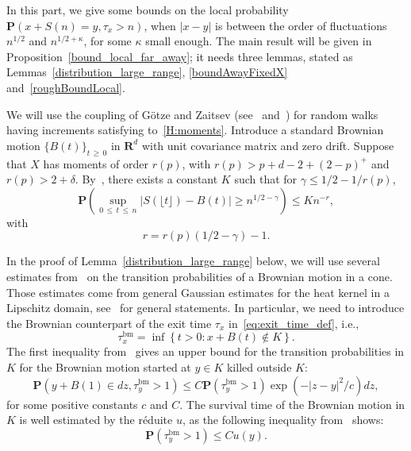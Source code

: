 \documentclass[10pt]{amsart}
\theoremstyle{definition}\newtheorem{defi}[theo]{Definition}\newtheorem{rema}[theo]{Remark}\newtheorem{exam}[theo]{Example}\newtheorem{exem}[theo]{Example}\newtheorem{nota}[theo]{Notation}
\DeclareMathOperator{\bm}{bm}
\newcommand{\pr}{\mathbf{P}}
\newcommand{\bfR}{\mathbf{R}}
\renewcommand{\leq}{\leqslant}
\renewcommand{\geq}{\geqslant}
\begin{document}
In this part, we give some bounds on the local probability $\pr(x+S(n)=y,\tau_{x}>n)$, when $|x-y|$ is between the order of fluctuations $n^{1/2}$ and $n^{1/2+\kappa}$, for some $\kappa$ small enough. The main result will be given in Proposition~\ref{bound_local_far_away}; it needs three lemmas, stated as Lemmas~\ref{distribution_large_range}, \ref{boundAwayFixedX} and~\ref{roughBoundLocal}.

We will use the coupling of G\"otze and Zaitsev (see~\cite[Theorem~4]{GoZa-09} and~\cite[Lemma~17]{DeWa-15}) for random walks having increments satisfying to~\eqref{H:moments}. Introduce a standard Brownian motion $\{B(t)\}_{t\,\geq\,0}$ in $\bfR^d$ with unit covariance matrix and zero drift. Suppose that $X$ has moments of order $r(p)$, with $r(p)>p+d-2+(2-p)^{+}$ and $r(p)>2+\delta$. By~\cite[Theorem~4]{GoZa-09}, there exists a constant $K$ such that for $\gamma\leq 1/2-1/r(p)$,
\begin{equation}\label{couplingEinmahl}
\pr\left(\sup_{0\,\leq\,t\,\leq\,n}\left| S\left(\lfloor t\rfloor\right)-B(t)\right| \geq n^{1/2-\gamma}\right)\leq Kn^{-r},
\end{equation}
with
\begin{equation}\label{eq:def_local_r}
r=r(p)(1/2-\gamma)-1.
\end{equation}

In the proof of Lemma~\ref{distribution_large_range} below, we will use several estimates from~\cite{RaTa-20} on the transition probabilities of a Brownian motion in a cone. Those estimates come from general Gaussian estimates for the heat kernel in a Lipschitz domain, see~\cite[Section~6]{GySa-11} for general statements. In particular, we need to introduce the Brownian counterpart of the exit time $\tau_x$ in~\eqref{eq:exit_time_def}, i.e.,
\begin{equation}\label{eq:exit_time_bm_def}
\tau_x^{\bm}=\inf\left\{t>0 : x+B(t)\notin K\right\}.
\end{equation}
The first inequality from~\cite[Theorem~5.11]{GySa-11} gives an upper bound for the transition probabilities in $K$ for the Brownian motion started at $y\in K$ killed outside $K$:
\begin{equation}\label{estimateK}
\pr\left(y+ B(1)\in dz,\tau_{y}^{\bm}>1\right)\leq C\pr\left(\tau_{y}^{\bm}>1\right)\exp\left(-|z-y|^{2}/c\right)dz,
\end{equation}
for some positive constants $c$ and $C$. The survival time of the Brownian motion in $K$ is well estimated by the réduite $u$, as the following inequality from~\cite[Theorem~5.4]{GySa-11} shows:
\begin{equation}\label{estimatek}
\pr\left(\tau_{y}^{\bm}>1\right)\leq Cu(y).
\end{equation}
\end{document}
